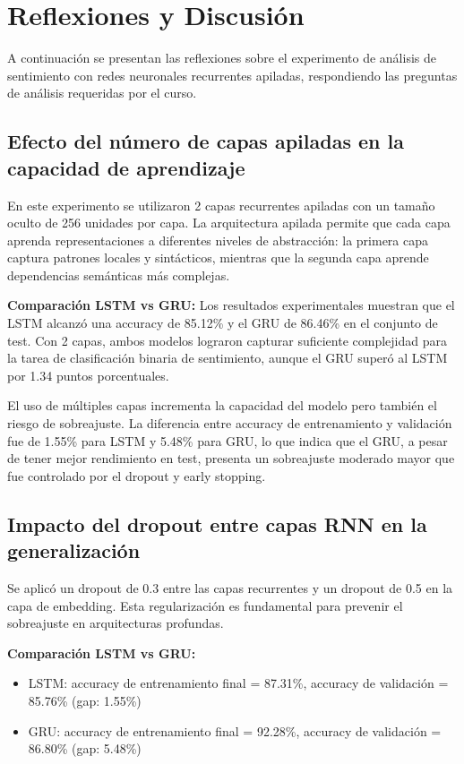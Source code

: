 \section{Reflexiones y Discusión}

A continuación se presentan las reflexiones sobre el experimento de análisis de sentimiento con redes neuronales recurrentes apiladas, respondiendo las preguntas de análisis requeridas por el curso.

\subsection{Efecto del número de capas apiladas en la capacidad de aprendizaje}

En este experimento se utilizaron 2 capas recurrentes apiladas con un tamaño oculto de 256 unidades por capa. La arquitectura apilada permite que cada capa aprenda representaciones a diferentes niveles de abstracción: la primera capa captura patrones locales y sintácticos, mientras que la segunda capa aprende dependencias semánticas más complejas.

\textbf{Comparación LSTM vs GRU:} Los resultados experimentales muestran que el LSTM alcanzó una accuracy de 85.12\% y el GRU de 86.46\% en el conjunto de test. Con 2 capas, ambos modelos lograron capturar suficiente complejidad para la tarea de clasificación binaria de sentimiento, aunque el GRU superó al LSTM por 1.34 puntos porcentuales.

El uso de múltiples capas incrementa la capacidad del modelo pero también el riesgo de sobreajuste. La diferencia entre accuracy de entrenamiento y validación fue de 1.55\% para LSTM y 5.48\% para GRU, lo que indica que el GRU, a pesar de tener mejor rendimiento en test, presenta un sobreajuste moderado mayor que fue controlado por el dropout y early stopping.

\subsection{Impacto del dropout entre capas RNN en la generalización}

Se aplicó un dropout de 0.3 entre las capas recurrentes y un dropout de 0.5 en la capa de embedding. Esta regularización es fundamental para prevenir el sobreajuste en arquitecturas profundas.

\textbf{Comparación LSTM vs GRU:}
\begin{itemize}
    \item LSTM: accuracy de entrenamiento final = 87.31\%, accuracy de validación = 85.76\% (gap: 1.55\%)
    \item GRU: accuracy de entrenamiento final = 92.28\%, accuracy de validación = 86.80\% (gap: 5.48\%)
\end{itemize}

